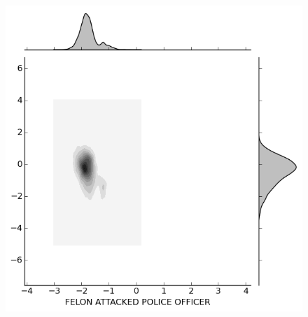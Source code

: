 \documentclass{evanarticle}
\begin{document}
\begin{figure}[H]
\begin{minipage}[b]{0.30\linewidth}
  \end{minipage}
  \quad
  \begin{minipage}[b]{0.30\linewidth}
    \includegraphics[width=\linewidth]{images/subcircum/FELON_ATTACKED_POLICE_OFFICER.png}
  \end{minipage}


\end{figure}
\end{document}
